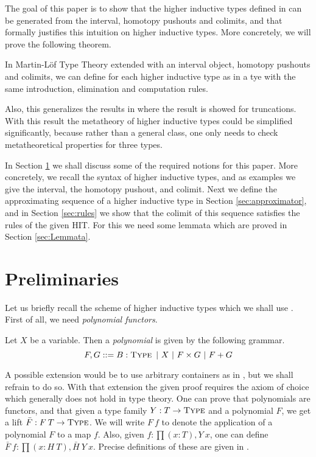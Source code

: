\documentclass[a4paper,UKenglish]{lipics-v2016}
\newcommand{\Type}[0]{\operatorname{\textsc{Type}}}
\begin{document}
The goal of this paper is to show that the higher inductive types defined in \cite{basoldhigher} can be generated from the interval, homotopy pushouts and colimits, and that formally justifies this intuition on higher inductive types.
More concretely, we will prove the following theorem.
\begin{theorem}
\label{thm:three-hit}
In Martin-L\"of Type Theory extended with an interval object, homotopy pushouts and colimits, we can define for each higher inductive type as in \cite{basoldhigher} a tye with the same introduction, elimination and computation rules.
\end{theorem}
Also, this generalizes the results in \cite{doorn2016constructing,kraus2014general,kraus2016constructions} where the result is showed for truncations.
With this result the metatheory of higher inductive types could be simplified significantly, because rather than a general class, one only needs to check metatheoretical properties for three types.

In Section \ref{sec:prelims} we shall discuss some of the required notions for this paper.
More concretely, we recall the syntax of higher inductive types, and as examples we give the interval, the homotopy pushout, and colimit.
Next we define the approximating sequence of a higher inductive type in Section \ref{sec:approximator}, and in Section \ref{sec:rules} we show that the colimit of this sequence satisfies the rules of the given HIT.
For this we need some lemmata which are proved in Section \ref{sec:Lemmata}.

\section{Preliminaries}
\label{sec:prelims}
Let us briefly recall the scheme of higher inductive types which we shall use \cite{basoldhigher}.
First of all, we need \emph{polynomial functors}.
\begin{definition}
Let $X$ be a variable.
Then a \emph{polynomial} is given by the following grammar.
\[
F, G ::= B : \Type \ | \ X \ | \ F \times G \ | \ F + G
\]
\end{definition}
A possible extension would be to use arbitrary containers as in \cite{abbott2005containers}, but we shall refrain to do so.
With that extension the given proof requires the axiom of choice which generally does not hold in type theory.
One can prove that polynomials are functors, and that given a type family $Y : T \rightarrow \Type$ and a polynomial $F$, we get a lift $\bar{F} : F \> T \rightarrow \Type$.
We will write $F \> f$ to denote the application of a polynomial $F$ to a map $f$.
Also, given $f : \prod (x : T), Y \> x$, one can define $\bar{F} \> f : \prod (x : H \> T), \bar{H} \> Y \> x$.
Precise definitions of these are given in \cite{basoldhigher}.
\end{document}

